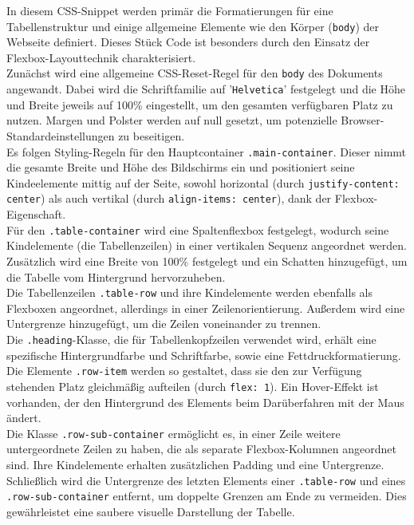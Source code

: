 \documentclass[./dokumentation.tex]{subfiles}
\begin{document}
In diesem CSS-Snippet werden primär die Formatierungen für eine Tabellenstruktur und einige allgemeine Elemente wie den Körper (\verb+body+) der Webseite definiert. Dieses Stück Code ist besonders durch den Einsatz der Flexbox-Layouttechnik charakterisiert.\\
Zunächst wird eine allgemeine CSS-Reset-Regel für den \verb+body+ des Dokuments angewandt. Dabei wird die Schriftfamilie auf '\verb+Helvetica+' festgelegt und die Höhe und Breite jeweils auf 100\% eingestellt, um den gesamten verfügbaren Platz zu nutzen. Margen und Polster werden auf null gesetzt, um potenzielle Browser-Standardeinstellungen zu beseitigen.\\
Es folgen Styling-Regeln für den Hauptcontainer \verb+.main-container+. Dieser nimmt die gesamte Breite und Höhe des Bildschirms ein und positioniert seine Kindeelemente mittig auf der Seite, sowohl horizontal (durch \verb+justify-content: center+) als auch vertikal (durch \verb+align-items: center+), dank der Flexbox-Eigenschaft.\\
Für den \verb+.table-container+ wird eine Spaltenflexbox festgelegt, wodurch seine Kindelemente (die Tabellenzeilen) in einer vertikalen Sequenz angeordnet werden. Zusätzlich wird eine Breite von 100\% festgelegt und ein Schatten hinzugefügt, um die Tabelle vom Hintergrund hervorzuheben.\\
Die Tabellenzeilen \verb+.table-row+ und ihre Kindelemente werden ebenfalls als Flexboxen angeordnet, allerdings in einer Zeilenorientierung. Außerdem wird eine Untergrenze hinzugefügt, um die Zeilen voneinander zu trennen.\\
Die \verb+.heading+-Klasse, die für Tabellenkopfzeilen verwendet wird, erhält eine spezifische Hintergrundfarbe und Schriftfarbe, sowie eine Fettdruckformatierung. \\
Die Elemente \verb+.row-item+ werden so gestaltet, dass sie den zur Verfügung stehenden Platz gleichmäßig aufteilen (durch \verb+flex: 1+). Ein Hover-Effekt ist vorhanden, der den Hintergrund des Elements beim Darüberfahren mit der Maus ändert.\\
Die Klasse \verb+.row-sub-container+ ermöglicht es, in einer Zeile weitere untergeordnete Zeilen zu haben, die als separate Flexbox-Kolumnen angeordnet sind. Ihre Kindelemente erhalten zusätzlichen Padding und eine Untergrenze.\\
Schließlich wird die Untergrenze des letzten Elements einer \verb+.table-row+ und eines \verb+.row-sub-container+ entfernt, um doppelte Grenzen am Ende zu vermeiden. Dies gewährleistet eine saubere visuelle Darstellung der Tabelle.\\
\end{document}
